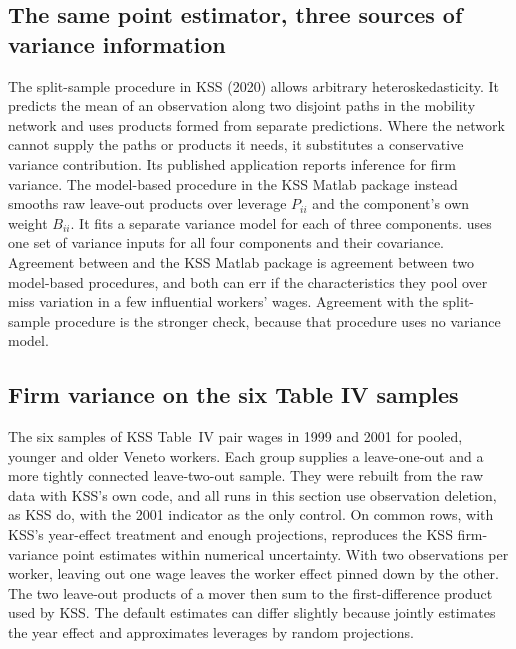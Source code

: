\subsection{The same point estimator, three sources of variance information}
The split-sample procedure in KSS (2020) allows arbitrary heteroskedasticity.
It predicts the mean of an observation along two disjoint paths in the
mobility network and uses products formed from separate predictions. Where
the network cannot supply the paths or products it needs, it substitutes a
conservative variance contribution. Its published application reports inference
for firm variance. The model-based procedure in the KSS Matlab package instead
smooths raw leave-out products over leverage $P_{ii}$ and the component's
own weight $B_{ii}$. It fits a separate variance model for each of three
components. \fevc{} uses one set of variance inputs for all four components and their
covariance. Agreement between \fevc{} and the KSS Matlab package is agreement between
two model-based procedures, and both can err if the characteristics they pool over
miss variation in a few influential workers' wages. Agreement with the split-sample
procedure is the stronger check, because that procedure uses no variance model.

\subsection{Firm variance on the six Table IV samples}\label{kss:sec:emp-se}
The six samples of KSS Table~IV pair wages in 1999 and 2001 for pooled,
younger and older Veneto workers. Each group supplies a leave-one-out and
a more tightly connected leave-two-out sample. They were rebuilt from the raw data
with KSS's own code, and all \fevc{} runs in this section use observation deletion,
as KSS do, with the 2001 indicator as the only control. On common rows, with KSS's
year-effect treatment and enough projections, \fevc{} reproduces the KSS
firm-variance point estimates within numerical uncertainty. With two
observations per worker, leaving out one wage leaves the worker effect
pinned down by the other. The two leave-out products of a mover then sum
to the first-difference product used by KSS. The default estimates can
differ slightly because \fevc{} jointly estimates the year effect and approximates
leverages by random projections.

